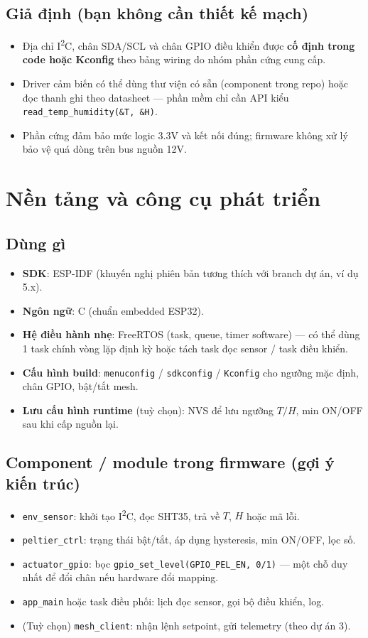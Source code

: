 \documentclass[12pt,a4paper]{report}
\begin{document}
\subsection{Giả định (bạn không cần thiết kế mạch)}
\begin{itemize}
  \item Địa chỉ I\textsuperscript{2}C, chân SDA/SCL và chân GPIO điều khiển được \textbf{cố định trong code hoặc Kconfig} theo bảng wiring do nhóm phần cứng cung cấp.
  \item Driver cảm biến có thể dùng thư viện có sẵn (component trong repo) hoặc đọc thanh ghi theo datasheet --- phần mềm chỉ cần API kiểu \texttt{read\_temp\_humidity(\&T, \&H)}.
  \item Phần cứng đảm bảo mức logic 3.3V và kết nối đúng; firmware không xử lý bảo vệ quá dòng trên bus nguồn 12V.
\end{itemize}

\section{Nền tảng và công cụ phát triển}

\subsection{Dùng gì}
\begin{itemize}
  \item \textbf{SDK}: ESP-IDF (khuyến nghị phiên bản tương thích với branch dự án, ví dụ 5.x).
  \item \textbf{Ngôn ngữ}: C (chuẩn embedded ESP32).
  \item \textbf{Hệ điều hành nhẹ}: FreeRTOS (task, queue, timer software) --- có thể dùng 1 task chính vòng lặp định kỳ hoặc tách task đọc sensor / task điều khiển.
  \item \textbf{Cấu hình build}: \texttt{menuconfig} / \texttt{sdkconfig} / \texttt{Kconfig} cho ngưỡng mặc định, chân GPIO, bật/tắt mesh.
  \item \textbf{Lưu cấu hình runtime} (tuỳ chọn): NVS để lưu ngưỡng $T/H$, min ON/OFF sau khi cấp nguồn lại.
\end{itemize}

\subsection{Component / module trong firmware (gợi ý kiến trúc)}
\begin{itemize}
  \item \texttt{env\_sensor}: khởi tạo I\textsuperscript{2}C, đọc SHT35, trả về $T$, $H$ hoặc mã lỗi.
  \item \texttt{peltier\_ctrl}: trạng thái bật/tắt, áp dụng hysteresis, min ON/OFF, lọc số.
  \item \texttt{actuator\_gpio}: bọc \texttt{gpio\_set\_level(GPIO\_PEL\_EN, 0/1)} --- một chỗ duy nhất để đổi chân nếu hardware đổi mapping.
  \item \texttt{app\_main} hoặc task điều phối: lịch đọc sensor, gọi bộ điều khiển, log.
  \item (Tuỳ chọn) \texttt{mesh\_client}: nhận lệnh setpoint, gửi telemetry (theo dự án 3).
\end{itemize}
\end{document}
